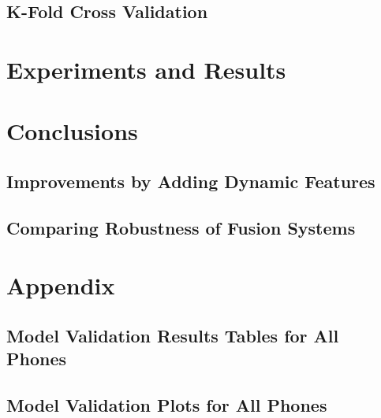 \documentclass[11pt,a4paper]{tesis}
\begin{document}
	\section{K-Fold Cross Validation}
		

\chapter{Experiments and Results}
	

\chapter{Conclusions}
	\section{Improvements by Adding Dynamic Features}
	\section{Comparing Robustness of Fusion Systems}

\chapter{Appendix}
	
	\section{Model Validation Results Tables for All Phones} \label{section:tables}
		
	\section{Model Validation Plots for All Phones} \label{section:plots}
		

\printbibliography
\end{document}
